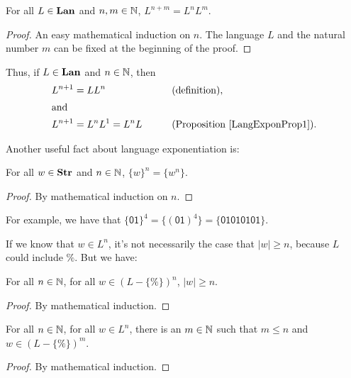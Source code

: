 \begin{proposition}
\label{LangExponProp1}
For all $L\in\mathbf{Lan}$ and $n,m\in\mathbb{N}$, $L^{n+m}=L^nL^m$.
\end{proposition}

\begin{proof}
An easy mathematical induction on $n$.  The language $L$ and the natural
number $m$ can be fixed at the beginning of the proof.
\end{proof}

Thus, if $L\in\mathbf{Lan}$ and $n\in\mathbb{N}$, then
\begin{alignat*}{2}
L^{n+1} &= LL^n && \qquad{\textrm{(definition)}}, \\
\intertext{and}
L^{n+1} &= L^nL^1 = L^nL && \qquad{\textrm{(Proposition~\ref{LangExponProp1})}} .
\end{alignat*}

Another useful fact about language exponentiation is:

\begin{proposition}
\label{LangExponProp2}
For all $w\in\mathbf{Str}$ and $n\in\mathbb{N}$, $\{w\}^n = \{w^n\}$.
\end{proposition}

\begin{proof}
By mathematical induction on $n$.
\end{proof}

For example, we have that $\{\mathsf{01}\}^4=\{(\mathsf{01})^4\}=
\{\mathsf{01010101}\}$.

If we know that $w\in L^n$, it's not necessarily the case that
$|w|\geq n$, because $L$ could include $\%$. But we have:

\begin{proposition}
\label{LanNEExponProp1}
For all $n\in\mathbb{N}$, for all $w\in (L-\{\%\})^n$, $|w| \geq n$.
\end{proposition}

\begin{proof}
By mathematical induction.
\end{proof}

\begin{proposition}
\label{LanNEExponProp2}
For all $n\in\mathbb{N}$, for all $w\in L^n$, there is an $m\in\mathbb{N}$ such
that $m\leq n$ and $w\in (L-\{\%\})^m$.
\end{proposition}

\begin{proof}
By mathematical induction.
\end{proof}

